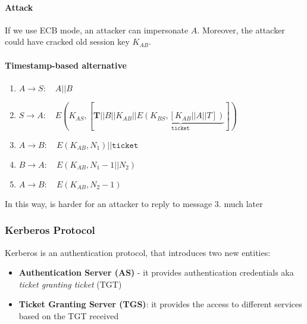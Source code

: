 \paragraph{Attack} If we use ECB mode, an attacker can impersonate $A$. Moreover, the attacker could have cracked old session key $K_{AB}$.

\paragraph{Timestamp-based alternative}
\begin{enumerate}
    \item $A\rightarrow S:\hspace{1em} A||B$
    \item $S\rightarrow A:\hspace{1em} E(K_{AS},[\textbf{T}||B||K_{AB}||\underbrace{E(K_{BS},[K_{AB}||A||T])}_{\texttt{ticket}}])$
    \item $A\rightarrow B:\hspace{1em} E(K_{AB},N_1)||\texttt{ticket}$
    \item $B\rightarrow A:\hspace{1em} E(K_{AB},N_1-1||N_2)$
    \item $A\rightarrow B:\hspace{1em} E(K_{AB},N_2-1)$
\end{enumerate}
In this way, is harder for an attacker to reply to message $3.$ much later

\subsubsection{Kerberos Protocol}
Kerberos is an authentication protocol, that introduces two new entities:
\begin{itemize}
    \item \textbf{Authentication Server (AS)} - it provides authentication credentials aka \textit{ticket granting ticket} (TGT)
    \item \textbf{Ticket Granting Server (TGS)}: it provides the access to different services based on the TGT received
\end{itemize}

